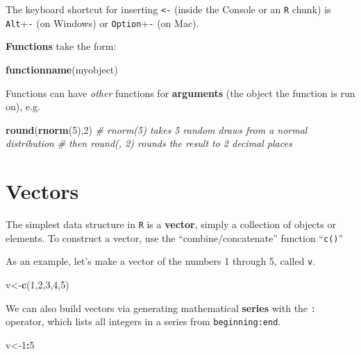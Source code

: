 \documentclass[]{book}
\newenvironment{Shaded}{\begin{snugshade}}{\end{snugshade}}
\newcommand{\KeywordTok}[1]{\textcolor[rgb]{0.13,0.29,0.53}{\textbf{#1}}}
\newcommand{\DecValTok}[1]{\textcolor[rgb]{0.00,0.00,0.81}{#1}}
\newcommand{\CommentTok}[1]{\textcolor[rgb]{0.56,0.35,0.01}{\textit{#1}}}
\newcommand{\OperatorTok}[1]{\textcolor[rgb]{0.81,0.36,0.00}{\textbf{#1}}}
\newcommand{\NormalTok}[1]{#1}
\theoremstyle{definition}
\theoremstyle{definition}
\theoremstyle{definition}
\theoremstyle{remark}
\begin{document}
The keyboard shortcut for inserting \texttt{\textless{}-} (inside the
Console or an \texttt{R} chunk) is \texttt{Alt}+\texttt{-} (on Windows)
or \texttt{Option}+\texttt{-} (on Mac).

\textbf{Functions} take the form:

\begin{Shaded}
\begin{Highlighting}[]
\KeywordTok{functionname}\NormalTok{(myobject)}
\end{Highlighting}
\end{Shaded}

Functions can have \emph{other} functions for \textbf{arguments} (the
object the function is run on), e.g.

\begin{Shaded}
\begin{Highlighting}[]
\KeywordTok{round}\NormalTok{(}\KeywordTok{rnorm}\NormalTok{(}\DecValTok{5}\NormalTok{),}\DecValTok{2}\NormalTok{) }
\CommentTok{# rnorm(5) takes 5 random draws from a normal distribution}
\CommentTok{# then round(, 2) rounds the result to 2 decimal places}
\end{Highlighting}
\end{Shaded}

\section{Vectors}\label{vectors}

The simplest data structure in \texttt{R} is a \textbf{vector}, simply a
collection of objects or elements. To construct a vector, use the
``combine/concatenate'' function ``\texttt{c()}''

As an example, let's make a vector of the numbers 1 through 5, called
\texttt{v}.

\begin{Shaded}
\begin{Highlighting}[]
\NormalTok{v<-}\KeywordTok{c}\NormalTok{(}\DecValTok{1}\NormalTok{,}\DecValTok{2}\NormalTok{,}\DecValTok{3}\NormalTok{,}\DecValTok{4}\NormalTok{,}\DecValTok{5}\NormalTok{)}
\end{Highlighting}
\end{Shaded}

We can also build vectors via generating mathematical \textbf{series}
with the \texttt{:} operator, which lists all integers in a series from
\texttt{beginning:end}.

\begin{Shaded}
\begin{Highlighting}[]
\NormalTok{v<-}\DecValTok{1}\OperatorTok{:}\DecValTok{5}
\end{Highlighting}
\end{Shaded}
\end{document}
